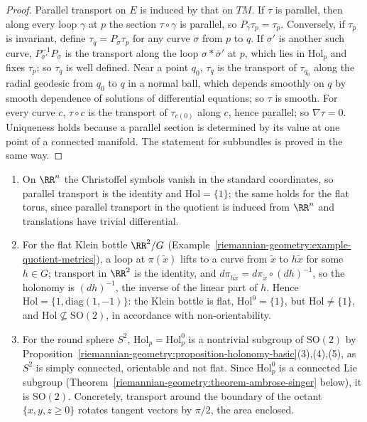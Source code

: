 \begin{proof}
Parallel transport on $E$ is induced by that on $TM$. If $\tau$ is parallel, then along every loop $\gamma$ at $p$ the section $\tau \circ \gamma$ is parallel, so $P_\gamma\tau_p = \tau_p$. Conversely, if $\tau_p$ is invariant, define $\tau_q = P_\sigma\tau_p$
for any curve $\sigma$ from $p$ to $q$. If $\sigma'$ is another such curve, $P_{\sigma'}^{-1}P_\sigma$ is the transport along the loop $\sigma * \bar\sigma'$ at $p$, which lies in $\mathrm{Hol}_p$ and fixes $\tau_p$; so
$\tau_q$ is well defined. Near a point $q_0$, $\tau_q$ is the transport of $\tau_{q_0}$ along the radial geodesic from $q_0$ to $q$ in a normal ball, which depends smoothly on $q$ by smooth dependence of solutions of
differential equations; so $\tau$ is smooth. For every curve $c$, $\tau \circ c$ is the transport of $\tau_{c(0)}$ along $c$, hence parallel; so $\nabla\tau = 0$. Uniqueness holds because a parallel section is determined by its value at one
point of a connected manifold. The statement for subbundles is proved in the same way.
\end{proof}

\begin{example}\label{riemannian-geometry:example-holonomy}
\begin{enumerate}
\item On $\RR^n$ the Christoffel symbols vanish in the standard coordinates, so parallel transport is the identity and $\mathrm{Hol} = \{1\}$; the same holds for the flat torus, since parallel transport in the quotient is induced from
$\RR^n$ and translations have trivial differential.
\item For the flat Klein bottle $\RR^2/G$ (Example~\ref{riemannian-geometry:example-quotient-metrics}), a loop at $\pi(\tilde x)$ lifts to a curve from $\tilde x$ to $h\tilde x$ for some $h \in G$; transport in $\RR^2$ is the identity, and
$d\pi_{h\tilde x} = d\pi_{\tilde x} \circ (dh)^{-1}$, so the holonomy is $(dh)^{-1}$, the inverse of the linear part of $h$. Hence $\mathrm{Hol} = \{1, \mathrm{diag}(1, -1)\}$: the Klein bottle is flat, $\mathrm{Hol}^0 = \{1\}$, but
$\mathrm{Hol} \neq \{1\}$, and $\mathrm{Hol} \not\subseteq \mathrm{SO}(2)$, in accordance with non-orientability.
\item For the round sphere $S^2$, $\mathrm{Hol}_p = \mathrm{Hol}^0_p$ is a nontrivial subgroup of $\mathrm{SO}(2)$ by Proposition~\ref{riemannian-geometry:proposition-holonomy-basic}(3),(4),(5), as $S^2$ is simply connected, orientable and
not flat. Since $\mathrm{Hol}^0_p$ is a connected Lie subgroup (Theorem~\ref{riemannian-geometry:theorem-ambrose-singer} below), it is $\mathrm{SO}(2)$. Concretely, transport around the boundary of the octant
$\{x, y, z \geq 0\}$ rotates tangent vectors by $\pi/2$, the area enclosed.
\end{enumerate}
\end{example}

